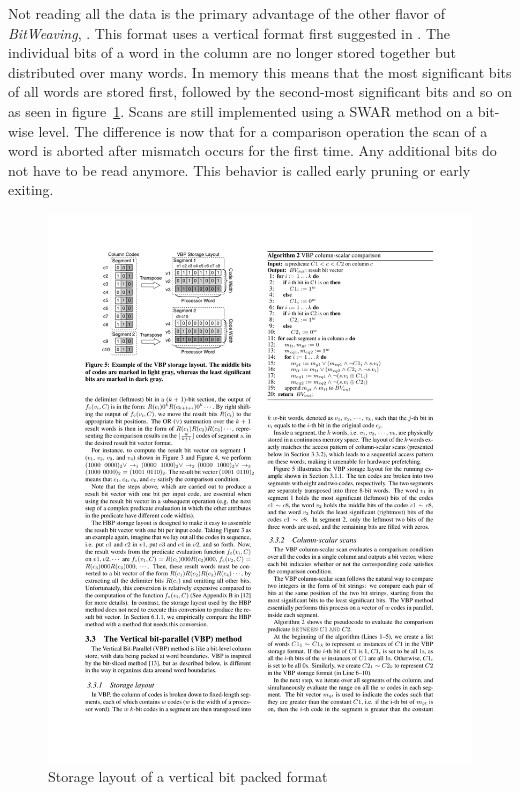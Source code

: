 Not reading all the data is the primary advantage of the other flavor of
\emph{BitWeaving}, \bwv{}. This format uses a vertical format first suggested in
\cite{oneill}. The individual bits of a word in the column are no longer stored
together but distributed over many words. In memory this means that the most
significant bits of all words are stored first, followed by the second-most
significant bits and so on as seen in figure~\ref{fig:bwv}. Scans are still
implemented using a SWAR method on a bit-wise level. The difference is now that
for a comparison operation the scan of a word is aborted after mismatch occurs
for the first time. Any additional bits do not have to be read anymore. This
behavior is called early pruning or early exiting.

\begin{figure}[h] \begin{center}
\includegraphics[scale=1.5]{images/bwv}
\end{center}
\caption{Storage layout of a vertical bit packed format~\cite{BitWeaving}}
\label{fig:bwv}
\end{figure}

